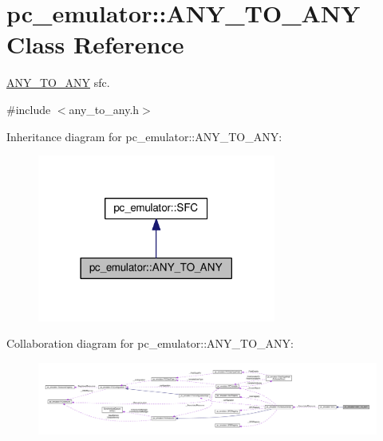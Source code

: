 \hypertarget{classpc__emulator_1_1ANY__TO__ANY}{}\section{pc\+\_\+emulator\+:\+:A\+N\+Y\+\_\+\+T\+O\+\_\+\+A\+NY Class Reference}
\label{classpc__emulator_1_1ANY__TO__ANY}


\hyperlink{classpc__emulator_1_1ANY__TO__ANY}{A\+N\+Y\+\_\+\+T\+O\+\_\+\+A\+NY} sfc.  




{\ttfamily \#include $<$any\+\_\+to\+\_\+any.\+h$>$}



Inheritance diagram for pc\+\_\+emulator\+:\+:A\+N\+Y\+\_\+\+T\+O\+\_\+\+A\+NY\+:\nopagebreak
\begin{figure}[H]
\begin{center}
\leavevmode
\includegraphics[width=222pt]{classpc__emulator_1_1ANY__TO__ANY__inherit__graph}
\end{center}
\end{figure}


Collaboration diagram for pc\+\_\+emulator\+:\+:A\+N\+Y\+\_\+\+T\+O\+\_\+\+A\+NY\+:\nopagebreak
\begin{figure}[H]
\begin{center}
\leavevmode
\includegraphics[width=350pt]{classpc__emulator_1_1ANY__TO__ANY__coll__graph}
\end{center}
\end{figure}
